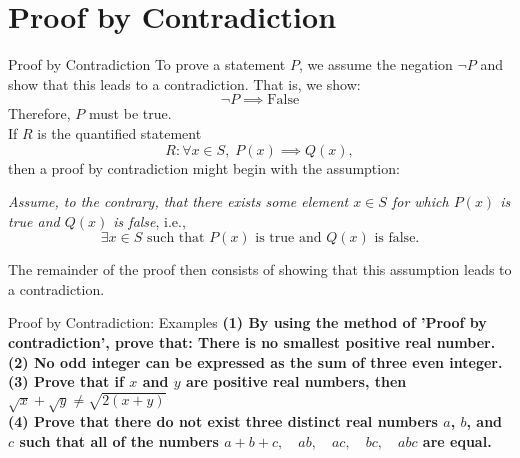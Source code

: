 \documentclass{beamer}
\begin{document}
\section{Proof by Contradiction}
\begin{frame}{Proof by Contradiction}
To prove a statement $P$, we assume the negation $\neg P$ and show that this leads to a contradiction.  
That is, we show:
\[
\neg P \implies \text{False}
\]
Therefore, $P$ must be true.\\ 

If $R$ is the quantified statement  
\[
R: \forall x \in S, \; P(x) \implies Q(x),
\]
then a proof by contradiction might begin with the assumption:  

\textit{Assume, to the contrary, that there exists some element $x \in S$ for which $P(x)$ is true and $Q(x)$ is false}, i.e.,  
\[
\exists x \in S \text{ such that } P(x) \text{ is true and } Q(x) \text{ is false}.
\]

The remainder of the proof then consists of showing that this assumption leads to a contradiction.

\end{frame}

\begin{frame}{Proof by Contradiction: Examples}
\textbf{(1) By using the method of 'Proof by contradiction', prove that: There is no smallest positive real number.}\\
\textbf{(2) No odd integer can be expressed as the sum of three even integer.}\\
\textbf{(3) Prove that if $x$ and $y$ are positive real numbers, then $
\sqrt{x} + \sqrt{y} \neq \sqrt{2(x + y)}$}\\ 
\textbf{(4) Prove that there do not exist three distinct real numbers $a$, $b$, and $c$ such that all of the numbers  $
a + b + c, \quad ab, \quad ac, \quad bc, \quad abc$
are equal.}
\end{frame}
\end{document}
